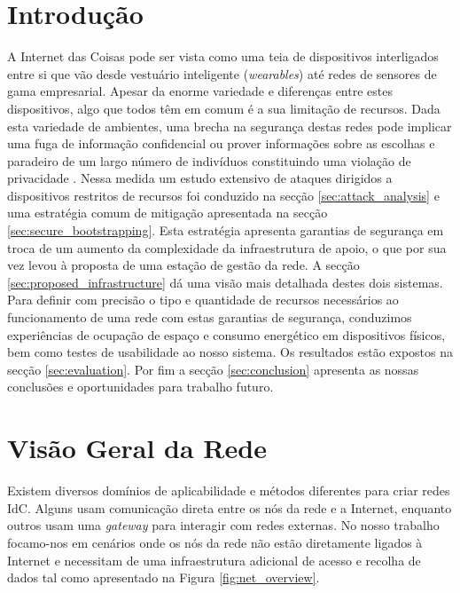 \documentclass{llncs}
\begin{document}
\section{Introdução}
A Internet das Coisas pode ser vista como uma teia de dispositivos interligados entre si que vão desde vestuário inteligente (\textit{wearables}) até redes de sensores de gama empresarial. Apesar da enorme variedade e diferenças entre estes dispositivos, algo que todos têm em comum é a sua limitação de recursos. 
Dada esta variedade de ambientes, uma brecha na segurança destas redes pode implicar uma fuga de informação confidencial ou prover informações sobre as escolhas e paradeiro de um largo número de indivíduos constituindo uma violação de privacidade \cite{Ukil2015}. 
Nessa medida um estudo extensivo de ataques dirigidos a dispositivos restritos de recursos foi conduzido na secção \ref{sec:attack_analysis} e uma estratégia comum de mitigação apresentada na secção \ref{sec:secure_bootstrapping}. 
Esta estratégia apresenta garantias de segurança em troca de um aumento da complexidade da infraestrutura de apoio, o que por sua vez levou à proposta de uma estação de gestão da rede. 
A secção \ref{sec:proposed_infrastructure} dá uma visão mais detalhada destes dois sistemas. Para definir com precisão o tipo e quantidade de recursos necessários ao funcionamento de uma rede com estas garantias de segurança, conduzimos experiências de ocupação de espaço e consumo energético em dispositivos físicos, bem como testes de usabilidade ao nosso sistema. 
Os resultados estão expostos na secção \ref{sec:evaluation}. Por fim a secção \ref{sec:conclusion} apresenta as nossas conclusões e oportunidades para trabalho futuro.


\section{Visão Geral da Rede}
\label{sec:network_overview}
Existem diversos domínios de aplicabilidade e métodos diferentes para criar redes \ac{IdC}. 
Alguns usam comunicação direta entre os nós da rede e a Internet, enquanto outros usam uma \textit{gateway} para interagir com redes externas. 
No nosso trabalho focamo-nos em cenários onde os nós da rede não estão diretamente ligados à Internet e necessitam de uma infraestrutura adicional de acesso e recolha de dados tal como apresentado na Figura \ref{fig:net_overview}.
\end{document}
